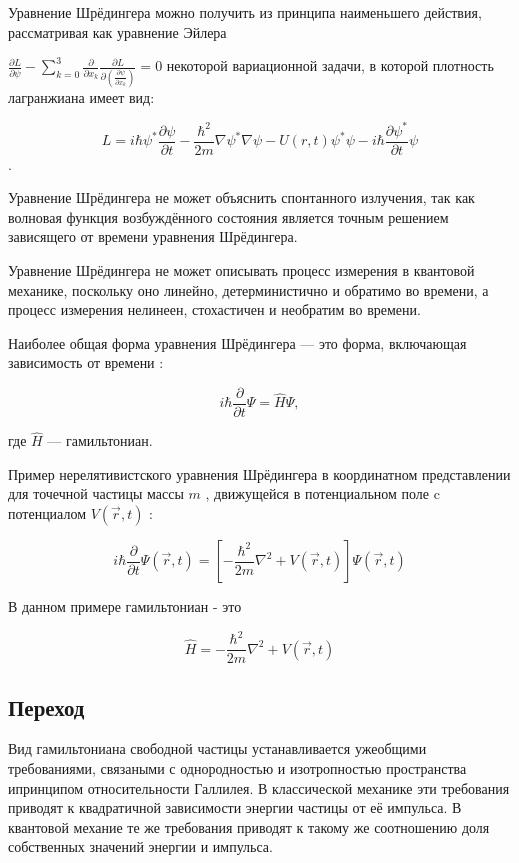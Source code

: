 \documentclass[a4paper,14pt,russian]{article}
\begin{document}
Уравнение Шрёдингера можно получить из принципа наименьшего действия, рассматривая как уравнение Эйлера 

$
\frac{\partial L}{\partial \psi} - \sum_{k=0}^{3} \frac{\partial}{\partial x_{k}} \frac{\partial L}{\partial \left ( \frac{\partial \psi}{\partial x_{k}} \right )} = 0
$
некоторой вариационной задачи, в которой плотность лагранжиана имеет вид: 

$$
L=i \hbar \psi^{*} \frac{\partial \psi}{\partial t} - \frac{\hbar^{2}}{2m} \nabla \psi^{*} \nabla \psi - U(r,t) \psi^{*} \psi - i \hbar \frac{\partial \psi^{*}}{\partial t} \psi
$$.

Уравнение Шрёдингера не может объяснить спонтанного излучения, так как волновая функция возбуждённого состояния является точным решением зависящего от времени уравнения Шрёдингера.

Уравнение Шрёдингера не может описывать процесс измерения в квантовой механике, поскольку оно линейно, детерминистично и обратимо во времени, а процесс измерения нелинеен, стохастичен и необратим во времени.

Наиболее общая форма уравнения Шрёдингера — это форма, включающая зависимость от времени :

$$
i \hbar \frac{\partial}{\partial t}\Psi = \hat H \Psi, 
$$

где 
$
\hat H
$ — гамильтониан.

Пример нерелятивистского уравнения Шрёдингера в координатном представлении для точечной частицы массы 
$
m 
$
, движущейся в потенциальном поле c потенциалом 
$
 V(\vec{r} ,t) 
$ :

$$
i\hbar\frac{\partial}{\partial t} \Psi(\vec{r} ,t) = \left [ -\frac{\hbar^2}{2m}\nabla^2 + V(\vec{r},t)\right ] \Psi(\vec{r} ,t)
$$

В данном примере гамильтониан - это

$$
\hat{H} = -\frac{\hbar^2}{2m}\nabla^2 + V(\vec{r},t)
$$

\subsection{Переход}

Вид гамильтониана свободной частицы устанавливается ужеобщими требованиями, связаными с однородностью и изотропностью пространства ипринципом относительности Галлилея. В классической механике эти требования приводят к квадратичной зависимости энергии частицы от её импульса. В квантовой механие те же требования приводят к такому же соотношению доля собственных значений энергии и импульса.
\end{document}
